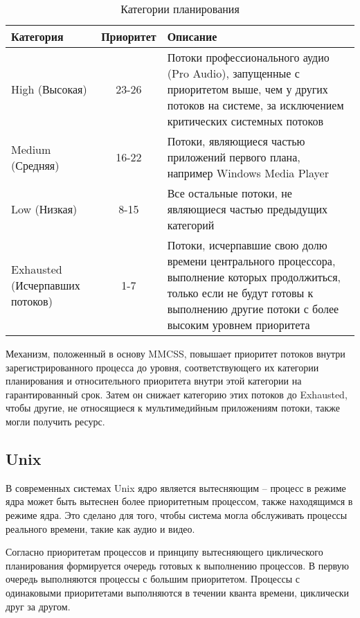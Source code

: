\begin{table}[h]
	\caption{Категории планирования}
	\begin{center}
		\begin{tabular}{| p{90pt} | c | p{245pt} |} 
			\hline
			\textbf{Категория} & \textbf{Приоритет} & \textbf{Описание}\\
			\hline
			{High (Высокая) } & 23-26  & {Потоки профессионального аудио
				(Pro Audio), запущенные с приоритетом выше, чем у других потоков
				на системе, за исключением критических системных потоков} \\
			\hline
			{Medium (Средняя)} & 16-22  & {Потоки, являющиеся частью приложений первого плана, например
				Windows Media Player}\\
			\hline
			{Low (Низкая)} & 8-15 & {Все остальные потоки, не являющиеся частью предыдущих категорий} \\
			\hline
			{Exhausted (Исчерпавших потоков)} & 1-7 & {Потоки, исчерпавшие свою долю
				времени центрального процессора,
				выполнение которых продолжиться,
				только если не будут готовы к выполнению другие потоки с более высоким уровнем приоритета}\\
			\hline
		\end{tabular}
	\end{center}
\end{table}


Механизм, положенный в основу MMCSS, повышает приоритет потоков
внутри зарегистрированного процесса до уровня, соответствующего их категории планирования и относительного приоритета внутри этой категории на гарантированный срок. Затем он снижает категорию этих потоков до Exhausted, чтобы другие, не относящиеся к мультимедийным приложениям потоки, также могли получить ресурс.

\subsection{Unix}

В современных системах Unix ядро является вытесняющим – процесс в режиме ядра может быть вытеснен более приоритетным процессом, также находящимся в режиме ядра. Это сделано для того, чтобы система могла обслуживать процессы реального времени, такие как  аудио и видео.

Согласно приоритетам процессов и принципу вытесняющего циклического планирования формируется очередь готовых к выполнению процессов. В первую очередь выполняются процессы с большим приоритетом. Процессы с одинаковыми приоритетами выполняются в течении кванта времени, циклически друг за другом.


